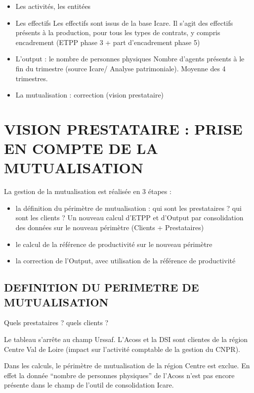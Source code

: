 \documentclass[
]{book}
\begin{document}
\begin{itemize}
\item
  Les activités, les entitées
\item
  Les effectifs
  Les effectifs sont issus de la base Icare.
  Il s'agit des effectifs présents à la production, pour tous les types de contrats, y compris encadrement (ETPP phase 3 + part d'encadrement phase 5)
\item
  L'output : le nombre de personnes physiques
  Nombre d'agents présents à le fin du trimestre (source Icare/ Analyse patrimoniale). Moyenne des 4 trimestres.
\item
  La mutualisation : correction (vision prestataire)
\end{itemize}

\hypertarget{vision-prestataire-prise-en-compte-de-la-mutualisation-3}{%
\section{VISION PRESTATAIRE : PRISE EN COMPTE DE LA MUTUALISATION}\label{vision-prestataire-prise-en-compte-de-la-mutualisation-3}}

La gestion de la mutualisation est réalisée en 3 étapes :

\begin{itemize}
\item
  la définition du périmètre de mutualisation : qui sont les prestataires ? qui sont les clients ? Un nouveau calcul d'ETPP et d'Output par consolidation des données sur le nouveau périmètre (Clients + Prestataires)
\item
  le calcul de la référence de productivité sur le nouveau périmètre
\item
  la correction de l'Output, avec utilisation de la référence de productivité
\end{itemize}

\hypertarget{definition-du-perimetre-de-mutualisation-3}{%
\subsection{DEFINITION DU PERIMETRE DE MUTUALISATION}\label{definition-du-perimetre-de-mutualisation-3}}

Quels prestataires ? quels clients ?

Le tableau s'arrête au champ Urssaf. L'Acoss et la DSI sont clientes de la région Centre Val de Loire (impact sur l'activité comptable de la gestion du CNPR).

Dans les calculs, le périmètre de mutualisation de la région Centre est exclue. En effet la donnée ``nombre de
personnes physiques'' de l'Acoss n'est pas encore présente dans le champ de l'outil de consolidation Icare.
\end{document}
